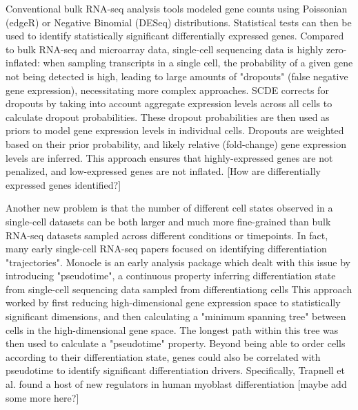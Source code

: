 Conventional bulk RNA-seq analysis tools modeled gene counts using Poissonian (edgeR) or Negative Binomial (DESeq) distributions. Statistical tests can then be used to identify statistically significant differentially expressed genes. Compared to bulk RNA-seq and microarray data, single-cell sequencing data is highly zero-inflated: when sampling transcripts in a single cell, the probability of a given gene not being detected is high, leading to large amounts of "dropouts" (false negative gene expression), necessitating more complex approaches. SCDE corrects for dropouts by taking into account aggregate expression levels across all cells to calculate dropout probabilities. These dropout probabilities are then used as priors to model gene expression levels in individual cells. Dropouts are weighted based on their prior probability, and likely relative (fold-change) gene expression levels are inferred. This approach ensures that highly-expressed genes are not penalized, and low-expressed genes are not inflated. [How are differentially expressed genes identified?]

Another new problem is that the number of different cell states observed in a single-cell datasets can be both larger and much more fine-grained than bulk RNA-seq datasets sampled across different conditions or timepoints. In fact, many early single-cell RNA-seq papers focused on identifying differentiation "trajectories". Monocle is an early analysis package which dealt with this issue by introducing "pseudotime", a continuous property inferring differentiation state from single-cell sequencing data sampled from differentiationg cells This approach worked by first reducing high-dimensional gene expression space to statistically significant dimensions, and then calculating a "minimum spanning tree" between cells in the high-dimensional gene space. The longest path within this tree was then used to calculate a "pseudotime" property. Beyond being able to order cells according to their differentiation state, genes could also be correlated with pseudotime to identify significant differentiation drivers. Specifically, Trapnell et al. found a host of new regulators in human myoblast differentiation [maybe add some more here?]

